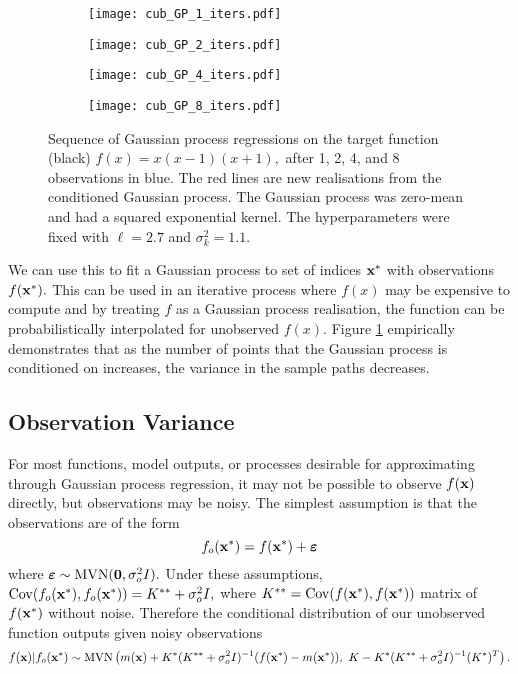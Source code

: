 \begin{figure}[htbp]
    \centering
    \begin{subfigure}[b]{0.5\textwidth}
        \centering
        \texttt{[image: cub\_GP\_1\_iters.pdf]}
    \end{subfigure}%
    \hfill%
    \begin{subfigure}[b]{0.5\textwidth}
        \centering
        \texttt{[image: cub\_GP\_2\_iters.pdf]}
    \end{subfigure}
    \begin{subfigure}[b]{0.5\textwidth}
        \centering
        \texttt{[image: cub\_GP\_4\_iters.pdf]}
    \end{subfigure}%
    \hfill%
    \begin{subfigure}[b]{0.5\textwidth}
        \centering
        \texttt{[image: cub\_GP\_8\_iters.pdf]}
    \end{subfigure}%
    \caption[{
        Gaussian process regression without noise
    }]{
        Sequence of Gaussian process regressions on the target function
        (black) $f(x) = x(x-1)(x+1),$ after 1, 2, 4, and 8 observations in
        blue. The red lines are new realisations from the conditioned Gaussian
        process. The Gaussian process was zero-mean and had a squared
        exponential kernel. The hyperparameters were fixed with $\ell = 2.7$
        and $\sigma^2_k = 1.1.$
    }
    \label{fig:no_var_cub_reg}
\end{figure}

We can use this to fit a Gaussian process to set of indices $\mathbf{x}^\ast$ with
observations $f(\mathbf{x}^\ast).$
This can be used in an iterative process where $f(x)$
may be expensive to compute and by treating $f$ as a Gaussian process
realisation, the function can be probabilistically interpolated for unobserved
$f(x).$ Figure \ref{fig:no_var_cub_reg} empirically demonstrates that as
the number of points that the Gaussian process is conditioned on increases,
the variance in the sample paths decreases.

\subsection*{Observation Variance}

For most functions, model outputs, or processes desirable for
approximating through Gaussian process regression, it may not be possible to
observe $f(\mathbf{x})$ directly, but observations may be noisy.
The simplest assumption is that the
observations are of the form
$$
    f_o(\mathbf{x}^\ast) = f(\mathbf{x}^\ast) + \bm{\varepsilon}
$$
where $\bm{\varepsilon} \sim \operatorname{MVN}(\mathbf{0}, \sigma^2_o I).$
Under these assumptions,
$\mathrm{Cov}(f_o(\mathbf{x}^\ast), f_o(\mathbf{x}^\ast)) = K^{**} + \sigma^2_o I,$
where $K^{**} = \mathrm{Cov}(f(\mathbf{x}^\ast), f(\mathbf{x}^\ast))$
matrix of $f(\mathbf{x}^\ast)$ without noise. Therefore the conditional
distribution of our unobserved function outputs given noisy observations
$$
    f(\mathbf{x}) | f_o(\mathbf{x}^\ast)
    \sim \operatorname{MVN}\left(
    m(\mathbf{x}) + K^{\ast}
    (K^{**} + \sigma^2_o I)^{-1}
    (f(\mathbf{x}^\ast) - m(\mathbf{x}^\ast)), \,\,
    K - K^{\ast}(K^{**} + \sigma^2_o I)^{-1}(K^{\ast})^T
    \right).
$$


